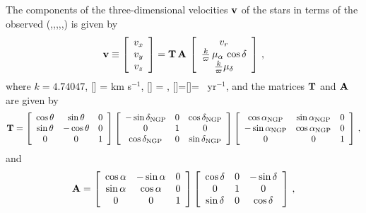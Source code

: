 The components of the three-dimensional velocities $\boldsymbol{\mathbf{v}}$ of the stars
in terms of the observed (\ra,\dec,\parallax,\pmra,\pmdec,\vrr) is
given by
\begin{equation}\label{eq:vrpmrapmdectoUVW2}
\boldsymbol{\mathbf{v}} \equiv \left[ \begin{array}{c} v_x \\ v_y \\ v_z \end{array} \right] =
\mathbf{T} \, \mathbf{A} \, \left[ \begin{array}{c} v_r  \\ \frac{k}{\varpi}\,\mu_{\alpha}\,\cos\delta\\\frac{k}{\varpi}\mu_{\delta}\end{array} \right]\, ,
\end{equation}
where $k =  4.74047$, [\vrr] = km s$^{-1}$, [\parallax] = \arcsecs,
[\pmra]=[\pmdec]= \arcsecs\ yr$^{-1}$, and the matrices $\mathbf{T}$ and $\mathbf{A}$
are given by
\begin{equation}\label{eq:radectolbT}
\mathbf{T} = \left[ \begin{array}{ccc} \cos \theta & \sin \theta & 0\\\sin \theta & -\cos \theta & 0\\0&0&1 \end{array} \right]
\left[ \begin{array}{ccc} -\sin \delta_{\textnormal{NGP}} & 0 & \cos \delta_{\textnormal{NGP}}\\ 0 & 1 & 0 \\ \cos \delta_{\textnormal{NGP}} & 0 & \sin \delta_{\textnormal{NGP}}\end{array} \right]
\left[ \begin{array}{ccc} \cos \alpha_{\textnormal{NGP}} &\sin\alpha_{\textnormal{NGP}}&0\\ -\sin\alpha_{\textnormal{NGP}} & \cos\alpha_{\textnormal{NGP}}&0\\ 0&0&1\end{array} \right]\, ,
\end{equation}
and
\begin{equation}
\mathbf{A} = \left[ \begin{array}{ccc} \cos \alpha & -\sin \alpha & 0 \\ \sin \alpha & \cos \alpha & 0 \\ 0 & 0& 1 \end{array} \right]
\left[ \begin{array}{ccc} \cos \delta & 0 & -\sin \delta\\ 0 & 1 & 0 \\ \sin \delta  & 0 & \cos\delta\end{array} \right]\, ,
\end{equation}
